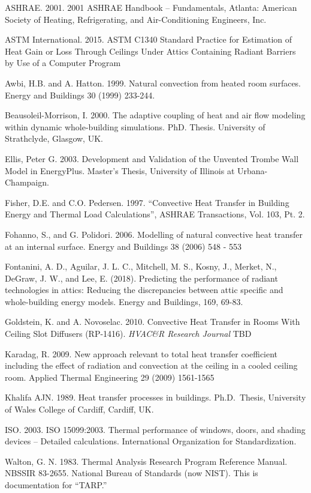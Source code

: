 ASHRAE. 2001. 2001 ASHRAE Handbook -- Fundamentals, Atlanta: American Society of Heating, Refrigerating, and Air-Conditioning Engineers, Inc.

ASTM International. 2015. ASTM C1340 Standard Practice for Estimation of Heat Gain or Loss Through Ceilings Under Attics Containing Radiant Barriers by Use of a Computer Program

Awbi, H.B. and A. Hatton. 1999. Natural convection from heated room surfaces. Energy and Buildings 30 (1999) 233-244.

Beausoleil-Morrison, I. 2000. The adaptive coupling of heat and air flow modeling within dynamic whole-building simulations. PhD. Thesis. University of Strathclyde, Glasgow, UK.

Ellis, Peter G. 2003. Development and Validation of the Unvented Trombe Wall Model in EnergyPlus. Master's Thesis, University of Illinois at Urbana-Champaign.

Fisher, D.E. and C.O. Pedersen. 1997. ``Convective Heat Transfer in Building Energy and Thermal Load Calculations'', ASHRAE Transactions, Vol. 103, Pt. 2.

Fohanno, S., and G. Polidori. 2006. Modelling of natural convective heat transfer at an internal surface. Energy and Buildings 38 (2006) 548 - 553

Fontanini, A. D., Aguilar, J. L. C., Mitchell, M. S., Kosny, J., Merket, N., DeGraw, J. W., and Lee, E. (2018). Predicting the performance of radiant technologies in attics: Reducing the discrepancies between attic specific and whole-building energy models. Energy and Buildings, 169, 69-83.

Goldstein, K. and A. Novoselac. 2010. Convective Heat Transfer in Rooms With Ceiling Slot Diffusers (RP-1416). \emph{HVAC\&R Research Journal} TBD

Karadag, R. 2009. New approach relevant to total heat transfer coefficient including the effect of radiation and convection at the ceiling in a cooled ceiling room. Applied Thermal Engineering 29 (2009) 1561-1565

Khalifa AJN. 1989. Heat transfer processes in buildings. Ph.D.~Thesis, University of Wales College of Cardiff, Cardiff, UK.

ISO. 2003. ISO 15099:2003. Thermal performance of windows, doors, and shading devices -- Detailed calculations. International Organization for Standardization.

Walton, G. N. 1983. Thermal Analysis Research Program Reference Manual. NBSSIR 83-2655. National Bureau of Standards (now NIST). This is documentation for ``TARP.''
